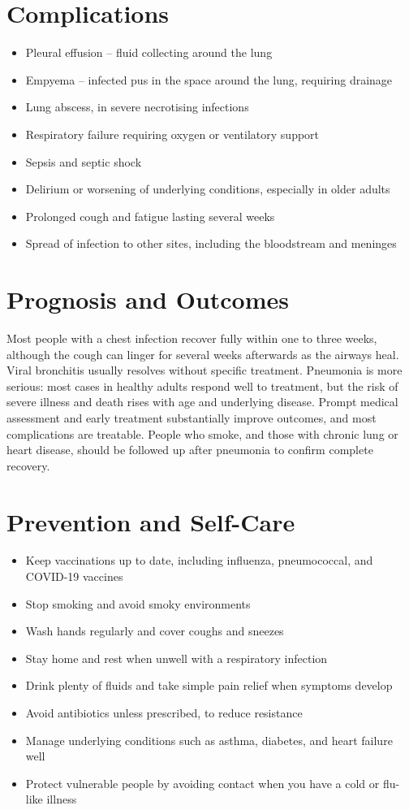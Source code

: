 \section*{Complications}
\begin{itemize}
    \item Pleural effusion -- fluid collecting around the lung
    \item Empyema -- infected pus in the space around the lung, requiring drainage
    \item Lung abscess, in severe necrotising infections
    \item Respiratory failure requiring oxygen or ventilatory support
    \item Sepsis and septic shock
    \item Delirium or worsening of underlying conditions, especially in older adults
    \item Prolonged cough and fatigue lasting several weeks
    \item Spread of infection to other sites, including the bloodstream and meninges
\end{itemize}

\section*{Prognosis and Outcomes}
Most people with a chest infection recover fully within one to three weeks, although the cough can linger for several weeks afterwards as the airways heal. Viral bronchitis usually resolves without specific treatment. Pneumonia is more serious: most cases in healthy adults respond well to treatment, but the risk of severe illness and death rises with age and underlying disease. Prompt medical assessment and early treatment substantially improve outcomes, and most complications are treatable. People who smoke, and those with chronic lung or heart disease, should be followed up after pneumonia to confirm complete recovery.

\section*{Prevention and Self-Care}
\begin{itemize}
    \item Keep vaccinations up to date, including influenza, pneumococcal, and COVID-19 vaccines
    \item Stop smoking and avoid smoky environments
    \item Wash hands regularly and cover coughs and sneezes
    \item Stay home and rest when unwell with a respiratory infection
    \item Drink plenty of fluids and take simple pain relief when symptoms develop
    \item Avoid antibiotics unless prescribed, to reduce resistance
    \item Manage underlying conditions such as asthma, diabetes, and heart failure well
    \item Protect vulnerable people by avoiding contact when you have a cold or flu-like illness
\end{itemize}

